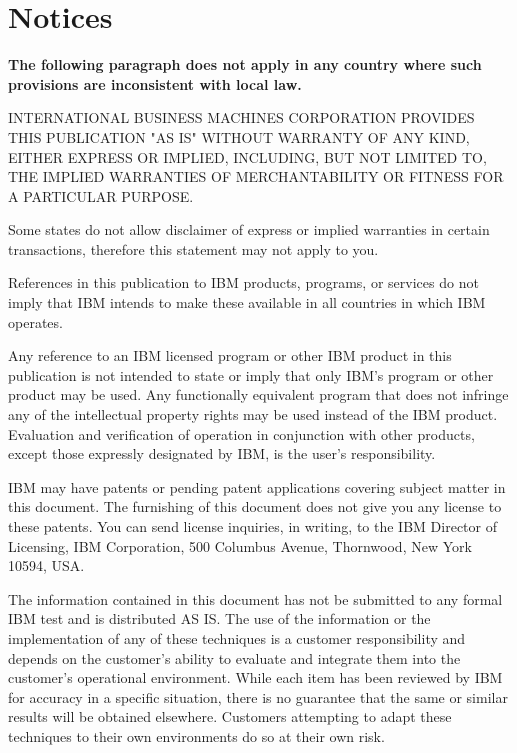 \documentclass[a4paper,12pt]{report}
\begin{document}
\chapter[Notices]{Notices}

\textbf{The following paragraph does not apply in any country where such
provisions are inconsistent with local law.
}

\noindent
INTERNATIONAL BUSINESS MACHINES CORPORATION PROVIDES THIS
PUBLICATION "AS IS" WITHOUT WARRANTY OF ANY KIND, EITHER EXPRESS OR
IMPLIED, INCLUDING, BUT NOT LIMITED TO, THE IMPLIED WARRANTIES OF
MERCHANTABILITY OR FITNESS FOR A PARTICULAR PURPOSE.

Some states do not allow disclaimer of express or implied warranties in certain
transactions, therefore this statement may not apply to you.

References in this publication to IBM products, programs, or services do not
imply that IBM intends to make these available in all countries in which IBM
operates.

Any reference to an IBM licensed program or other IBM product in this
publication is not intended to state or imply that only IBM's program or other
product may be used.  Any functionally equivalent program that does not infringe
any of the intellectual property rights may be used instead of the IBM product.
Evaluation and verification of operation in conjunction with other products,
except those expressly designated by IBM, is the user's responsibility.

IBM may have patents or pending patent applications covering subject matter
in this document.  The furnishing of this document does not give you any license
to these patents.  You can send license inquiries, in writing, to the IBM
Director of Licensing, IBM Corporation, 500 Columbus Avenue, Thornwood, New York
10594, USA.

The information contained in this document has not be submitted to any formal
IBM test and is distributed AS IS.  The use of the information or the
implementation of any of these techniques is a customer responsibility and
depends on the customer's ability to evaluate and integrate them into the
customer's operational environment.  While each item has been reviewed by IBM
for accuracy in a specific situation, there is no guarantee that the same or
similar results will be obtained elsewhere.  Customers attempting to adapt these
techniques to their own environments do so at their own risk.
\end{document}
